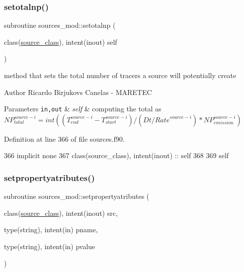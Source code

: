 \subsubsection{\texorpdfstring{setotalnp()}{setotalnp()}}
{\footnotesize\ttfamily subroutine sources\+\_\+mod\+::setotalnp (\begin{DoxyParamCaption}\item[{class(\mbox{\hyperlink{structsources__mod_1_1source__class}{source\+\_\+class}}), intent(inout)}]{self }\end{DoxyParamCaption})\hspace{0.3cm}{\ttfamily [private]}}



method that sets the total number of tracers a source will potentially create 

\begin{DoxyAuthor}{Author}
Ricardo Birjukovs Canelas -\/ M\+A\+R\+E\+T\+EC
\end{DoxyAuthor}

\begin{DoxyParams}[1]{Parameters}
\mbox{\tt in,out}  & {\em self} & computing the total as ${NP}_{total}^{source-i}=int((T_{end}^{source-i}-T_{start}^{source-i})/(Dt/{Rate}^{source-i})*{NP}_{emission}^{source-i})$ \\
\hline
\end{DoxyParams}


Definition at line 366 of file sources.\+f90.


\begin{DoxyCode}
366     \textcolor{keywordtype}{implicit none}
367     \textcolor{keywordtype}{class}(source\_class), \textcolor{keywordtype}{intent(inout)} :: self
368     
369     self%
\end{DoxyCode}
\mbox{\label{namespacesources__mod_abbb4557b46c533439fe258cecf31a76c}} 
\subsubsection{\texorpdfstring{setpropertyatributes()}{setpropertyatributes()}}
{\footnotesize\ttfamily subroutine sources\+\_\+mod\+::setpropertyatributes (\begin{DoxyParamCaption}\item[{class(\mbox{\hyperlink{structsources__mod_1_1source__class}{source\+\_\+class}}), intent(inout)}]{src,  }\item[{type(string), intent(in)}]{pname,  }\item[{type(string), intent(in)}]{pvalue }\end{DoxyParamCaption})\hspace{0.3cm}{\ttfamily [private]}}



